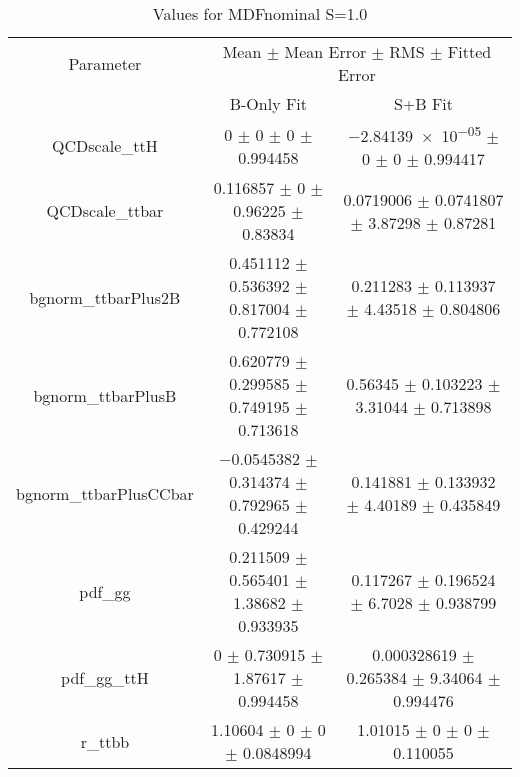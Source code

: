 \begin{table}
\centering
\caption{Values for MDFnominal S=1.0}
\begin{tabular}{ccc}
\toprule
Parameter & \multicolumn{2}{c}{Mean $\pm$ Mean Error $\pm$ RMS $\pm$ Fitted Error}\\
 & B-Only Fit & S+B Fit\\
\midrule
QCDscale\_ttH & \num{0} $\pm$ \num{0} $\pm$ \num{0} $\pm$ \num{0.994458} & \num{-2.84139e-05} $\pm$ \num{0} $\pm$ \num{0} $\pm$ \num{0.994417}\\
QCDscale\_ttbar & \num{0.116857} $\pm$ \num{0} $\pm$ \num{0.96225} $\pm$ \num{0.83834} & \num{0.0719006} $\pm$ \num{0.0741807} $\pm$ \num{3.87298} $\pm$ \num{0.87281}\\
bgnorm\_ttbarPlus2B & \num{0.451112} $\pm$ \num{0.536392} $\pm$ \num{0.817004} $\pm$ \num{0.772108} & \num{0.211283} $\pm$ \num{0.113937} $\pm$ \num{4.43518} $\pm$ \num{0.804806}\\
bgnorm\_ttbarPlusB & \num{0.620779} $\pm$ \num{0.299585} $\pm$ \num{0.749195} $\pm$ \num{0.713618} & \num{0.56345} $\pm$ \num{0.103223} $\pm$ \num{3.31044} $\pm$ \num{0.713898}\\
bgnorm\_ttbarPlusCCbar & \num{-0.0545382} $\pm$ \num{0.314374} $\pm$ \num{0.792965} $\pm$ \num{0.429244} & \num{0.141881} $\pm$ \num{0.133932} $\pm$ \num{4.40189} $\pm$ \num{0.435849}\\
pdf\_gg & \num{0.211509} $\pm$ \num{0.565401} $\pm$ \num{1.38682} $\pm$ \num{0.933935} & \num{0.117267} $\pm$ \num{0.196524} $\pm$ \num{6.7028} $\pm$ \num{0.938799}\\
pdf\_gg\_ttH & \num{0} $\pm$ \num{0.730915} $\pm$ \num{1.87617} $\pm$ \num{0.994458} & \num{0.000328619} $\pm$ \num{0.265384} $\pm$ \num{9.34064} $\pm$ \num{0.994476}\\
r\_ttbb & \num{1.10604} $\pm$ \num{0} $\pm$ \num{0} $\pm$ \num{0.0848994} & \num{1.01015} $\pm$ \num{0} $\pm$ \num{0} $\pm$ \num{0.110055}\\
\bottomrule
\end{tabular}
\end{table}